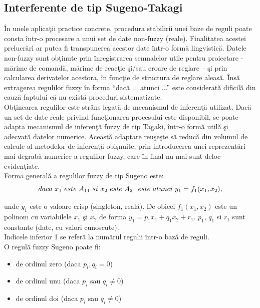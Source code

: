 \documentclass[11pt]{article}
\newcommand{\EqRow}{\vspace{1.5mm}}
\begin{document}
\subsection{Interferente de tip Sugeno-Takagi}
În unele aplicaţii practice concrete, procedura stabilirii unei baze de reguli poate consta într-o procesare a unui set de date non-fuzzy (reale). Finalitatea acestei prelucrări ar putea fi transpunerea acestor date într-o formă lingvistică. Datele non-fuzzy sunt obţinute prin înregistrarea semnalelor utile pentru proiectare - mărime de comandă, mărime de reacţie şi/sau eroare de reglare – şi prin calcularea derivatelor acestora, în funcţie de structura de reglare aleasă. Însă extragerea regulilor fuzzy în forma “dacă ... atunci ...” este considerată dificilă din cauză faptului că nu există proceduri sistematizate.
\\
Obţinearea regulilor este strâns legată de mecanismul de inferenţă utilizat.
Dacă un set de date reale privind funcţionarea procesului este disponibil, se poate adapta mecanismul de inferenţă fuzzy de tip Tagaki, într-o formă utilă şi adecvată datelor numerice. Această adaptare reuşeşte să reducă din volumul de calcule al metodelor de inferenţă obişnuite, prin introducerea unei reprezentări mai degrabă numerice a regulilor fuzzy, care în final nu mai sunt deloc evidenţiate.
\\
Forma generală a regulilor fuzzy de tip Sugeno este:
\begin{equation} 
daca \ x_1 \ este \ A_{11} \  si \ x_2 \ este \ A_{21} \ este \ atunci \ y_1 = f_1(x_1, x_2),
\EqRow
\end{equation}

unde $y_1$ este o valoare crisp (singleton, reală). De obicei $f_1(x_1, x_2)$ este un polinom cu variabilele $x_1$ şi $x_2$ de forma $y_1 = p_1x_1 +q_1x_2+ r_1$.
$p_1$, $q_1$ si $r_1$ sunt constante (date, cu valori cunoscute).\\
Indicele inferior 1 se referă la numărul regulii într-o bază de reguli.\\
O regulă fuzzy Sugeno poate fi:
\begin{itemize}
	\item de ordinul zero (daca $p_i,q_i=0$)
	\item de ordinul unu (daca $p_i$ sau $q_i \ne 0$)
	\item de ordinul doi (daca $p_i$ sau $q_i \ne 0$)
\end{itemize}
\end{document}
